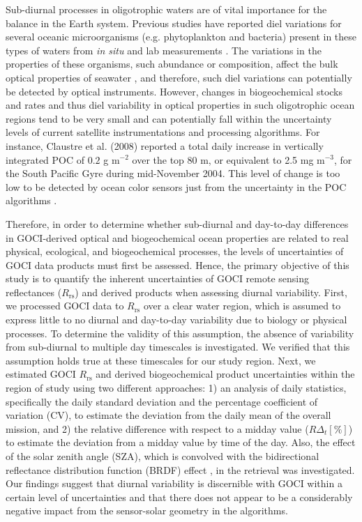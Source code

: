 \documentclass[remotesensing,article,submit,moreauthors,pdftex,10pt,a4paper]{Definitions/mdpi}
\begin{document}
Sub-diurnal processes in oligotrophic waters are of vital importance for the balance in the Earth system. Previous studies have reported diel variations for several oceanic microorganisms (e.g. phytoplankton and bacteria) present in these types of waters from {\it in situ} \cite{Claustre1999,Claustre2002,Ribalet2015,Karl2017} and lab measurements \cite{StramskiAndReynolds1993,Stramski1995,Zinser2009}. The variations in the properties of these organisms, such abundance or composition, affect the bulk optical properties of seawater \cite{Siegel1989,Gardner1995,Walsh1995,Claustre1999,Twardowski2007}, and therefore, such diel variations can potentially be detected by optical instruments. However, changes in biogeochemical stocks and rates and thus diel variability in optical properties in such oligotrophic ocean regions tend to be very small and can potentially fall within the uncertainty levels of current satellite instrumentations and processing algorithms. For instance, Claustre et al. (2008) \cite{Claustre2008} reported a total daily increase in vertically integrated POC of $0.2$ g m$^{-2}$ over the top 80 m, or equivalent to 2.5 mg m$^{-3}$, for the South Pacific Gyre during mid-November 2004. This level of change is too low to be detected by ocean color sensors just from the uncertainty in the POC algorithms \cite{EversKing2017_POCunc}.


Therefore, in order to determine whether sub-diurnal and day-to-day differences in GOCI-derived optical and biogeochemical ocean properties are related to real physical, ecological, and biogeochemical processes, the levels of uncertainties of GOCI data products must first be assessed. Hence, the primary objective of this study is to quantify the inherent uncertainties of GOCI remote sensing reflectances ($R_\text{rs}$) and derived products when assessing diurnal variability. First, we processed GOCI data to $R_\text{rs}$ over a clear water region, which is assumed to express little to no diurnal and day-to-day variability due to biology or physical processes. To determine the validity of this assumption, the absence of variability from sub-diurnal to multiple day timescales is investigated. We verified that this assumption holds true at these timescales for our study region. Next, we estimated GOCI $R_\text{rs}$ and derived biogeochemical product uncertainties within the region of study using two different approaches: 1) an analysis of daily statistics, specifically the daily standard deviation and the percentage coefficient of variation (CV), to estimate the deviation from the daily mean of the overall mission, and 2) the relative difference with respect to a midday value ($R\Delta_t[\%]$) to estimate the deviation from a midday value by time of the day. Also, the effect of the solar zenith angle (SZA), which is convolved with the bidirectional reflectance distribution function (BRDF) effect \cite{Mobley2016}, in the retrieval was investigated. Our findings suggest that diurnal variability is discernible with GOCI within a certain level of uncertainties and that there does not appear to be a considerably negative impact from the sensor-solar geometry in the algorithms. 
\end{document}
